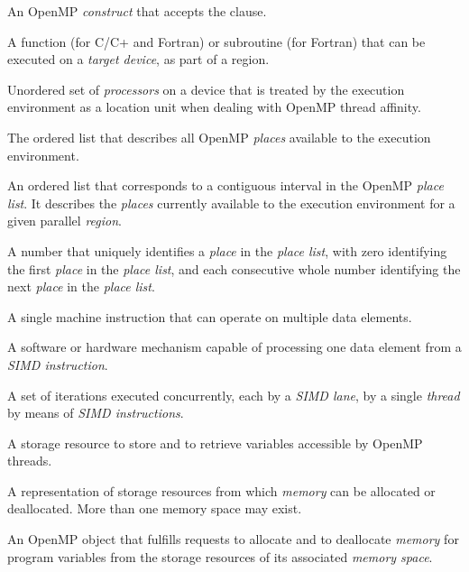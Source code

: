 \glossarydefstart
An OpenMP \emph{construct} that accepts the  clause.
\glossarydefend

\glossarydefstart
A function (for C/C+ and Fortran) or subroutine (for Fortran) that can be
executed on a \emph{target device}, as part of a  region.
\glossarydefend

\glossarydefstart
Unordered set of \emph{processors} on a device that is treated by the 
execution environment as a location unit when dealing with OpenMP thread 
affinity.
\glossarydefend

\glossarydefstart
The ordered list that describes all OpenMP \emph{places} available to 
the execution environment.
\glossarydefend

\glossarydefstart
An ordered list that corresponds to a contiguous interval in the OpenMP 
\emph{place list}. It describes the \emph{places} currently available to 
the execution environment for a given parallel \emph{region}.
\glossarydefend

\glossarydefstart
A number that uniquely identifies a \emph{place} in the \emph{place list}, 
with zero identifying the first \emph{place} in the \emph{place list}, and 
each consecutive whole number identifying the next \emph{place} in the 
\emph{place list}.
\glossarydefend

\glossarydefstart
A single machine instruction that can operate on multiple data elements.
\glossarydefend

\glossarydefstart
A software or hardware mechanism capable of processing one data element from a
\emph{SIMD instruction}.
\glossarydefend

\glossarydefstart
A set of iterations executed concurrently, each by a \emph{SIMD lane}, by 
a single \emph{thread} by means of \emph{SIMD instructions}.
\glossarydefend

\glossarydefstart
A storage resource to store and to retrieve variables accessible by 
OpenMP threads.
\glossarydefend

\glossarydefstart
A representation of storage resources from which \emph{memory} can 
be allocated or deallocated.  More than one memory space may exist.
\glossarydefend

\glossarydefstart
An OpenMP object that fulfills requests to allocate and to deallocate 
\emph{memory} for program variables from the storage resources of its 
associated \emph{memory space}.
\glossarydefend

